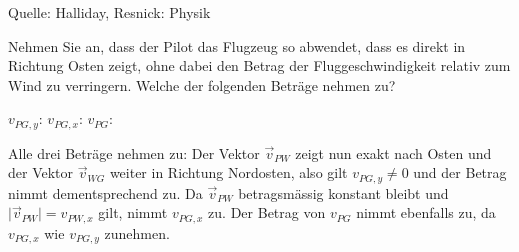 \begin{MExercises}
\begin{MExercise}
               Quelle: Halliday, Resnick: Physik
               \end{MExercise}
               
               \begin{MExercise}
               Nehmen Sie an, dass der Pilot das Flugzeug so abwendet, dass es direkt in Richtung Osten zeigt, ohne dabei den Betrag der Fluggeschwindigkeit relativ zum Wind zu verringern. Welche der folgenden Betr\"age nehmen zu?\\
               
                  \begin{MQuestionGroup}
                  $v_{PG,y}$:  
                  $v_{PG,x}$:  
                  $v_{PG  }$:  
                  \end{MQuestionGroup}
                  
                  \begin{MSolution}
                  Alle drei Betr\"age nehmen zu: Der Vektor $\vec{v}_{PW}$ zeigt nun exakt nach Osten und der Vektor $\vec{v}_{WG}$ weiter in Richtung Nordosten, also gilt $v_{PG,y}\neq 0$ und der Betrag nimmt dementsprechend zu. Da $\vec{v}_{PW}$ betragsm\"assig konstant bleibt und $\vert{\vec{v}_{PW}}\vert=v_{PW,x}$ gilt, nimmt $v_{PG,x}$ zu.
                  Der Betrag von $v_{PG}$ nimmt ebenfalls zu, da $v_{PG,x}$ wie $v_{PG,y}$ zunehmen.
               \end{MSolution}
               \end{MExercise}
               
      \end{MExercises}

                              
                
               
               
